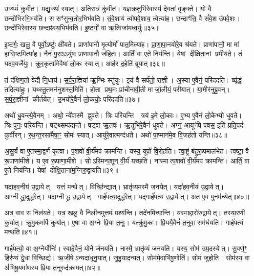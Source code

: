 उ॒क्थ्यं॑ कुर्वीत।
यद्यु॒क्थः॑ स्यात्।
अ॒ति॒रा॒त्रं कु॑र्वीत।
य॒ज्ञ॒क्र॒तुभि॑रे॒वास्य॑ दे॒वता॑ वृङ्क्ते।
यो वै छन्दो॑भिरभि॒भव॑ति।
स सꣳ॑सुन्व॒तोर॒भिभ॑वति।
सं॒वे॒शाय॑ त्वोपवे॒शाय॒ त्वेत्या॑ह।
छन्दाꣳ॑सि॒ वै सं॑वे॒श उ॑पवे॒शः।
छन्दो॑भिरे॒वास्य॒ छन्दाꣴ॑स्य॒भिभ॑वति।
इ॒ष्टर्गो॒ वा ऋ॒त्विजा॑मध्व॒र्युः॥३५॥

इ॒ष्टर्गः॒ खलु॒ वै पूर्वो॒\-ऽर्ष्टुः क्षी॑यते।
प्राणा॑पानौ मृ॒त्योर्मा॑ पात॒मित्या॑ह।
प्रा॒णा॒पा॒नयो॑रे॒व श्र॑यते।
प्राणा॑पानौ॒ मा मा॑ हासिष्ट॒मित्या॑ह।
नैनं॑ पु॒रा\-ऽऽयु॑षः प्राणापा॒नौ ज॑हितः।
आर्तिं॒ वा ए॒ते निय॑न्ति।
येषां दीक्षि॒तानां प्र॒मीय॑ते।
तं यद॑व॒वर्जे॑युः।
क्रू॒र॒कृता॑मिवैषां लो॒कः स्यात्।
आह॑र द॒हेति॑ ब्रूयात्॥३६॥

तं द॑क्षिण॒तो वेद्यै॑ नि॒धाय॑।
स॒र्प॒रा॒ज्ञिया॑ ऋ॒ग्भिः स्तु॑युः।
इ॒यं वै सर्प॑तो॒ राज्ञी।
अ॒स्या ए॒वैनं॒ परि॑ददति।
व्यृ॑द्धं॒ तदित्या॑हुः।
यथ्स्तु॒तमन॑नुशस्त॒मिति॑।
होता प्रथ॒मः प्रा॑चीनावी॒ती मार्जा॒लीयं॒ परी॑यात्।
या॒मीर॑नुब्रु॒वन्।
स॒र्प॒रा॒ज्ञीनां कीर्तयेत्।
उ॒भयो॑रे॒वैनं॑ लो॒कयोः॒ परि॑ददति॥३७॥

अथो॑ धु॒वन्त्ये॒वैनम्।
अथो॒ न्ये॑वास्मै ह्नुवते।
त्रिः परि॑यन्ति।
त्रय॑ इ॒मे लो॒काः।
ए॒भ्य ए॒वैनं॑ लो॒केभ्यो॑ धुवते।
त्रिः पुनः॒ परि॑यन्ति।
षट्थ्सम्प॑द्यन्ते।
षड्वा ऋ॒तवः॑।
ऋ॒तुभि॑रे॒वैनं॑ धुवते।
अग्न॒ आयूꣳ॑षि पवस॒ इति॑ प्रति॒पदं॑ कुर्वीरन्।
र॒थ॒न्त॒रसा॑मैषा॒ꣳ॒ सोमः॑ स्यात्।
आयु॑रे॒वात्मन्द॑धते।
अथो॑ पा॒प्मान॑मे॒व वि॒जह॑तो यन्ति॥३८॥\anuvakamend[अ॒भिजि॑त्यै पृथि॒व्याश्च॒ स्याद॑ध्व॒र्युर्ब्रू॑याल्लो॒कयोः॒ परि॑ददति कुर्वीर॒ꣴ॒स्त्रीणि॑ च]

अ॒सु॒र्यं॑ वा ए॒तस्मा॒द्वर्णं॑ कृ॒त्वा।
प॒शवो॑ वी॒र्य॑मप॑ क्रामन्ति।
यस्य॒ यूपो॑ वि॒रोह॑ति।
त्वा॒ष्ट्रं ब॑हुरू॒पमाल॑भेत।
त्वष्टा॒ वै रू॒पाणा॑मीशे।
य ए॒व रू॒पाणा॒मीशे।
सोऽस्मिन्प॒शून् वी॒र्यं॑ यच्छति।
नास्मात्प॒शवो॑ वी॒र्य॑मप॑ क्रामन्ति।
आर्तिं॒ वा ए॒ते निय॑न्ति।
येषां दीक्षि॒ताना॑म॒ग्निरु॒द्वाय॑ति॥३९॥

यदा॑हव॒नीय॑ उ॒द्वायेत्।
यत्तं मन्थेत्।
विच्छि॑न्द्यात्।
भ्रातृ॑व्यमस्मै जनयेत्।
यदा॑हव॒नीय॑ उ॒द्वायेत्।
आग्नीद्ध्रा॒दुद्ध॑\-रेत्।
यदाग्नीद्ध्र उ॒द्वायेत्।
गार्\mbox{}ह॑पत्या॒दुद्ध॑रेत्।
यद्गार्\mbox{}ह॑पत्य उ॒द्वायेत्।
अत॑ ए॒व पुन॑र्मन्थेत्॥४०॥

अत्र॒ वाव स निल॑यते।
यत्र॒ खलु॒ वै निली॑नमुत्त॒मं पश्य॑न्ति।
तदे॑नमिच्छन्ति।
यस्मा॒द्दारो॑रु॒द्वायेत्।
तस्या॒रणी॑ कुर्यात्।
क्रु॒मु॒कमपि॑ कुर्यात्।
ए॒षा वा अ॒ग्नेः प्रि॒या त॒नूः।
यत्क्रु॑मु॒कः।
प्रि॒ययै॒वैनं॑ त॒नुवा॒ सम॑र्धयति।
गार्\mbox{}ह॑पत्यं मन्थति॥४१॥

गार्\mbox{}ह॑पत्यो॒ वा अ॒ग्नेर्योनिः॑।
स्वादे॒वैनं॒ योनेर्जनयति।
नास्मै॒ भ्रातृ॑व्यं जनयति।
यस्य॒ सोम॑ उप॒दस्येत्।
सु॒वर्ण॒ꣳ॒ हिर॑ण्यं द्वे॒धा वि॒च्छिद्य॑।
ऋ॒जी॒षे\-ऽन्यदा॑धूनु॒यात्।
जु॒हु॒याद॒न्यत्।
सोम॑मे॒वाभि॑षु॒णोति॑।
सोमं॑ जुहोति।
सोम॑स्य॒ वा अ॑भिषू॒यमा॑णस्य प्रि॒या त॒नूरुद॑क्रामत्॥४२॥


